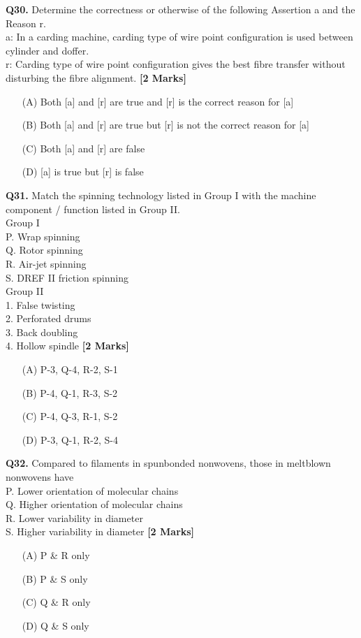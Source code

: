 \documentclass[11pt]{article}
\newcommand{\questionb}[2]{
    \noindent\textbf{Q#2.} #1 \hfill \textbf{[2 Marks]}
}
\begin{document}
\questionb{Determine the correctness or otherwise of the following Assertion a and the Reason r. \\
a: In a carding machine, carding type of wire point configuration is used between cylinder and doffer. \\
r: Carding type of wire point configuration gives the best fibre transfer without disturbing the fibre alignment.}{30}
\begin{enumerate}
    \item[(A)] Both [a] and [r] are true and [r] is the correct reason for [a]
    \item[(B)] Both [a] and [r] are true but [r] is not the correct reason for [a]
    \item[(C)] Both [a] and [r] are false
    \item[(D)] [a] is true but [r] is false
\end{enumerate}
\vspace{0.5cm}

\questionb{Match the spinning technology listed in Group I with the machine component / function listed in Group II. \\
Group I \\
P. Wrap spinning \\
Q. Rotor spinning \\
R. Air-jet spinning \\
S. DREF II friction spinning \\
Group II \\
1. False twisting \\
2. Perforated drums \\
3. Back doubling \\
4. Hollow spindle}{31}
\begin{enumerate}
    \item[(A)] P-3, Q-4, R-2, S-1
    \item[(B)] P-4, Q-1, R-3, S-2
    \item[(C)] P-4, Q-3, R-1, S-2
    \item[(D)] P-3, Q-1, R-2, S-4
\end{enumerate}
\vspace{0.5cm}

\questionb{Compared to filaments in spunbonded nonwovens, those in meltblown nonwovens have \\
P. Lower orientation of molecular chains \\
Q. Higher orientation of molecular chains \\
R. Lower variability in diameter \\
S. Higher variability in diameter}{32}
\begin{enumerate}
    \item[(A)] P \& R only
    \item[(B)] P \& S only
    \item[(C)] Q \& R only
    \item[(D)] Q \& S only
\end{enumerate}
\vspace{0.5cm}
\end{document}
